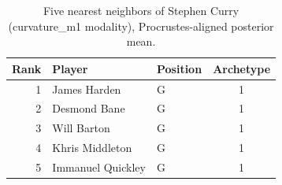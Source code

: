 \begin{table}[htbp]
  \centering\small
  \begin{tabular}{rllc}
    \toprule
    Rank & Player & Position & Archetype \\
    \midrule
    1 & James Harden & G & 1 \\
    2 & Desmond Bane & G & 1 \\
    3 & Will Barton & G & 1 \\
    4 & Khris Middleton & G & 1 \\
    5 & Immanuel Quickley & G & 1 \\
    \bottomrule
  \end{tabular}
  \caption{Five nearest neighbors of Stephen Curry (curvature_m1 modality), Procrustes-aligned posterior mean.}
  \label{tab:Stephen_Curry_neighbors_curvature_m1}
\end{table}

